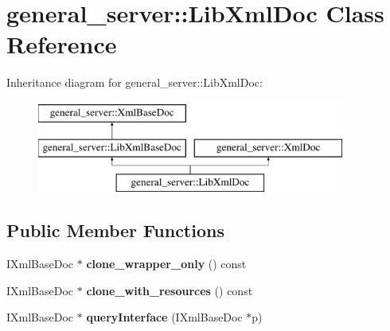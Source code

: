 \hypertarget{classgeneral__server_1_1LibXmlDoc}{\section{general\-\_\-server\-:\-:\-Lib\-Xml\-Doc \-Class \-Reference}
\label{classgeneral__server_1_1LibXmlDoc}
}
\-Inheritance diagram for general\-\_\-server\-:\-:\-Lib\-Xml\-Doc\-:\begin{figure}[H]
\begin{center}
\leavevmode
\includegraphics[height=3.000000cm]{classgeneral__server_1_1LibXmlDoc}
\end{center}
\end{figure}
\subsection*{\-Public \-Member \-Functions}
\begin{DoxyCompactItemize}
\item 
\hypertarget{classgeneral__server_1_1LibXmlDoc_af71cd14c074caafafe1e3ef0b73c15c3}{\-I\-Xml\-Base\-Doc $\ast$ {\bfseries clone\-\_\-wrapper\-\_\-only} () const }\label{classgeneral__server_1_1LibXmlDoc_af71cd14c074caafafe1e3ef0b73c15c3}

\item 
\hypertarget{classgeneral__server_1_1LibXmlDoc_a8ff6df90701ec4075e3f3c4fdf187c81}{\-I\-Xml\-Base\-Doc $\ast$ {\bfseries clone\-\_\-with\-\_\-resources} () const }\label{classgeneral__server_1_1LibXmlDoc_a8ff6df90701ec4075e3f3c4fdf187c81}

\item 
\hypertarget{classgeneral__server_1_1LibXmlDoc_af54b2b9275272a4fd6d351369e5d5e68}{\-I\-Xml\-Base\-Doc $\ast$ {\bfseries query\-Interface} (\-I\-Xml\-Base\-Doc $\ast$p)}\label{classgeneral__server_1_1LibXmlDoc_af54b2b9275272a4fd6d351369e5d5e68}

\end{DoxyCompactItemize}
